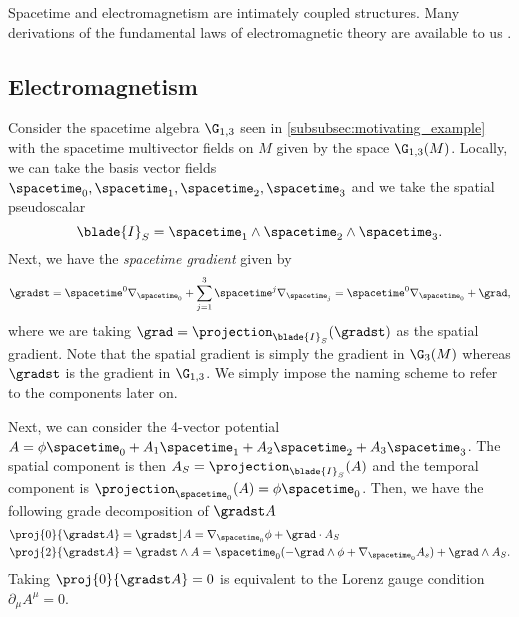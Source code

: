 
Spacetime and electromagnetism are intimately coupled structures. Many derivations of the fundamental laws of electromagnetic theory are available to us \cite{delphenich_axioms_2005}. 

\subsection{Electromagnetism}

Consider the spacetime algebra $\G_{1,3}$ seen in \cref{subsubsec:motivating_example} with the spacetime multivector fields on $M$ given by the space $\G_{1,3}(M)$. Locally, we can take the basis vector fields $\spacetime_0,\spacetime_1,\spacetime_2,\spacetime_3$ and we take the spatial pseudoscalar 
\begin{equation}
\blade{I}_S = \spacetime_1 \wedge \spacetime_2 \wedge \spacetime_3.
\end{equation}
Next, we have the \emph{spacetime gradient} given by
\begin{equation}
\gradst = \spacetime^0 \nabla_{\spacetime_0} + \sum_{j=1}^3 \spacetime^j \nabla_{\spacetime_j} = \spacetime^0 \nabla_{\spacetime_0} + \grad,
\end{equation}
where we are taking $\grad = \projection_{\blade{I}_S}(\gradst)$ as the spatial gradient. Note that the spatial gradient is simply the gradient in $\G_3(M)$ whereas $\gradst$ is the gradient in $\G_{1,3}$. We simply impose the naming scheme to refer to the components later on.

Next, we can consider the 4-vector potential $A=\phi \spacetime_0 + A_1 \spacetime_1 + A_2 \spacetime_2 + A_3 \spacetime_3$. The spatial component is then $A_S = \projection_{\blade{I}_S}(A)$ and the temporal component is $\projection_{\spacetime_0}(A) = \phi \spacetime_0$. Then, we have the following grade decomposition of $\gradst A$
\begin{align}
    \proj{0}{\gradst A} &= \gradst \rfloor A= \nabla_{\spacetime_0} \phi + \grad \cdot A_S\\
    \proj{2}{\gradst A} &= \gradst \wedge A = \spacetime_0 (-\grad \wedge \phi + \nabla_{\spacetime_0} A_s) + \grad \wedge A_S.
\end{align}
Taking $\proj{0}{\gradst A} = 0$ is equivalent to the Lorenz gauge condition $\partial_\mu A^\mu = 0$. 



